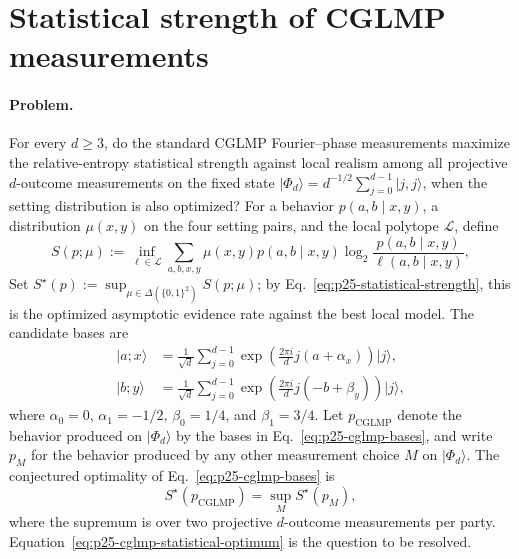 \section{Statistical strength of CGLMP measurements}
\label{sec:op_a34f0e2d6489068f}

\paragraph{Problem.}
For every $d\geq3$, do the standard CGLMP Fourier--phase measurements maximize
the relative-entropy statistical strength against local realism among all
projective $d$-outcome measurements on the fixed state
$\lvert\Phi_d\rangle=d^{-1/2}\sum_{j=0}^{d-1}\lvert j,j\rangle$, when the
setting distribution is also optimized?  For a behavior $p(a,b\mid x,y)$, a
distribution $\mu(x,y)$ on the four setting pairs, and the local polytope
$\mathcal L$, define
\begin{equation}
  S(p;\mu)
  :=\inf_{\ell\in\mathcal L}
    \sum_{a,b,x,y}\mu(x,y)p(a,b\mid x,y)
    \log_2\!\frac{p(a,b\mid x,y)}{\ell(a,b\mid x,y)},
  \label{eq:p25-statistical-strength}
\end{equation}
Set $S^\star(p):=\sup_{\mu\in\Delta(\{0,1\}^2)}S(p;\mu)$; by
Eq.~\eqref{eq:p25-statistical-strength}, this is the optimized asymptotic
evidence rate against the best local model.  The candidate bases are
\begin{equation}
  \begin{aligned}
    \lvert a;x\rangle
      &=\frac{1}{\sqrt d}\sum_{j=0}^{d-1}
        \exp\!\left(\frac{2\pi i}{d}j(a+\alpha_x)\right)\lvert j\rangle,\\
    \lvert b;y\rangle
      &=\frac{1}{\sqrt d}\sum_{j=0}^{d-1}
        \exp\!\left(\frac{2\pi i}{d}j(-b+\beta_y)\right)\lvert j\rangle,
  \end{aligned}
  \label{eq:p25-cglmp-bases}
\end{equation}
where $\alpha_0=0$, $\alpha_1=-1/2$, $\beta_0=1/4$, and $\beta_1=3/4$.
Let $p_{\mathrm{CGLMP}}$ denote the behavior produced on
$\lvert\Phi_d\rangle$ by the bases in Eq.~\eqref{eq:p25-cglmp-bases}, and
write $p_M$ for the behavior produced by any other measurement choice $M$ on
$\lvert\Phi_d\rangle$.  The conjectured optimality of
Eq.~\eqref{eq:p25-cglmp-bases} is
\begin{equation}
  S^\star(p_{\mathrm{CGLMP}})
  =\sup_M S^\star(p_M),
  \label{eq:p25-cglmp-statistical-optimum}
\end{equation}
where the supremum is over two projective $d$-outcome measurements per party.
Equation~\eqref{eq:p25-cglmp-statistical-optimum} is the question to be
resolved.

